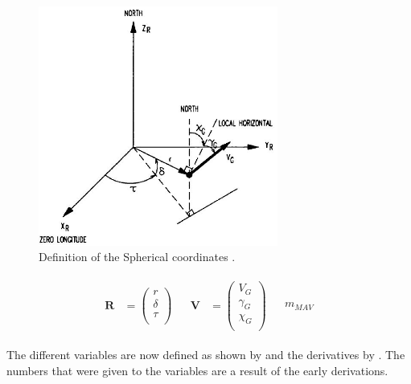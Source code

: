  \begin{figure}[!ht]
\centering
\includegraphics[width=0.7\textwidth]{figures/tsi/spherical_mooij1994motion.jpg}
\caption{Definition of the Spherical coordinates \citep{mooij1994motion}.}
\label{fig:spherical_mooij1994motion}
\end{figure}

\begin{align} \label{eq:spherVecDef}
\begin{split}
\mathbf{R} &= 
\begin{pmatrix}
r \\
\delta \\
\tau \\
\end{pmatrix}
\end{split}
&
\begin{split}
\mathbf{V} &= 
\begin{pmatrix}
V_{G} \\
\gamma_{G} \\
\chi_{G} \\
\end{pmatrix}
\end{split}
&
\begin{split}
m_{MAV}
\end{split}
\end{align}

The different variables are now defined as shown by  and the derivatives by . The numbers that were given to the variables are a result of the early derivations.

